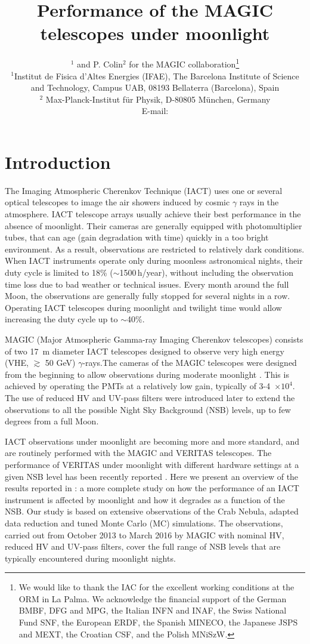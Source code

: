 \documentclass{PoS}
\title{Performance of the MAGIC telescopes under moonlight}
\author{\speaker{D. Guberman}$^{1}$ and P. Colin$^{2}$ for the MAGIC collaboration\thanks{We would like to thank the IAC for the excellent working conditions at the ORM in La Palma. We acknowledge the financial support of the German BMBF, DFG and MPG, the Italian INFN and INAF, the Swiss National Fund SNF, the European ERDF, the Spanish MINECO, the Japanese JSPS and MEXT, the Croatian CSF, and the Polish MNiSzW.}\\
       $^{1}$Institut de Fisica d'Altes Energies (IFAE), The Barcelona Institute of Science and Technology, Campus UAB, 08193 Bellaterra (Barcelona), Spain\\
       $^{2}$ Max-Planck-Institut f\"ur Physik, D-80805 M\"unchen, Germany \\
        E-mail: \email{dguberman@ifae.es}}
\begin{document}
\section{Introduction}\label{sec:Intro}

The Imaging Atmospheric Cherenkov Technique (IACT) uses one or several optical telescopes to image the air showers induced by cosmic $\gamma$ rays in the atmosphere. IACT telescope arrays usually achieve their best performance in the absence of moonlight. Their cameras are generally equipped with photomultiplier tubes, that can age (gain degradation with time) quickly in a too bright environment. As a result, observations are restricted to relatively dark conditions. When IACT instruments operate only during moonless astronomical nights, their duty cycle is limited to 18\% ($\sim$1500\,h/year), without including the observation time loss due to bad weather or technical issues. Every month around the full Moon, the observations are generally fully stopped for several nights in a row. Operating IACT telescopes during moonlight and twilight time would allow increasing the duty cycle up to $\sim$40\%.

MAGIC (Major Atmospheric Gamma-ray Imaging Cherenkov telescopes) consists of two 17~m diameter IACT telescopes designed to observe very high energy (VHE, $\gtrsim$ 50 GeV) $\gamma$-rays\cite{upgrade1}.The cameras of the MAGIC telescopes were designed from the beginning to allow observations during moderate moonlight \cite{OldMoon, MagicMoon-ICRC2009}. This is achieved by operating the PMTs at a relatively low gain, typically of 3-4~$ \times 10^4$. The use of reduced HV \cite{MagicMoonShadow} and UV-pass filters \cite{Filters} were introduced later to extend the observations to all the possible Night Sky Background (NSB) levels, up to few degrees from a full Moon.

IACT observations under moonlight are becoming more and more standard, and
are routinely performed with the MAGIC and VERITAS\cite{VERITAS2008} telescopes. The
performance of VERITAS under moonlight with different hardware settings at
a given NSB level has been recently reported \cite{VeritasNew}. Here we present an overview of the results reported in \cite{MAGIC_moon}: a more complete study on how the performance of an IACT instrument is affected by moonlight and how it degrades as a function of
the NSB. Our study is based on extensive observations of the Crab Nebula,
adapted data reduction and tuned Monte Carlo (MC) simulations. The
observations, carried out from October 2013 to March 2016 by MAGIC with
nominal HV, reduced HV and UV-pass filters, cover the full range of NSB
levels that are typically encountered during moonlight nights.
\end{document}
